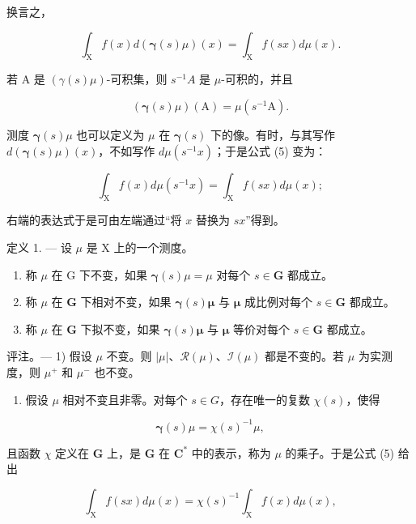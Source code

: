 换言之，

\[
\int_ {\mathrm{X}} f (x) d (\boldsymbol {\gamma} (s) \mu) (x) = \int_ {\mathrm{X}} f (s x) d \mu (x).\tag{5}
\]

若 A 是 \((\gamma(s)\mu)\)-可积集，则 \(s^{-1}A\) 是 \(\mu\)-可积的，并且

\[
\left(\boldsymbol {\gamma} (s) \mu\right) (\mathrm{A}) = \mu \left(s ^ {- 1} \mathrm{A}\right).\tag{6}
\]

测度 \(\boldsymbol{\gamma}(s)\mu\) 也可以定义为 \(\mu\) 在 \(\boldsymbol{\gamma}(s)\) 下的像。有时，与其写作 \(d(\boldsymbol{\gamma}(s)\mu)(x)\)，不如写作 \(d\mu(s^{-1}x)\)；于是公式 (5) 变为：

\[
\int_ {\mathrm{X}} f (x) d \mu (s ^ {- 1} x) = \int_ {\mathrm{X}} f (s x) d \mu (x);
\]

右端的表达式于是可由左端通过“将 \(x\) 替换为 \(sx\)”得到。

定义 1. --- 设 \(\mu\) 是 X 上的一个测度。

\begin{enumerate}
\def\labelenumi{\alph{enumi})}
\item
  称 \(\mu\) 在 G 下不变，如果 \(\pmb{\gamma}(s)\mu = \mu\) 对每个 \(s\in \mathbf{G}\) 都成立。
\item
  称 \(\mu\) 在 \(\mathbf{G}\) 下相对不变，如果 \(\pmb{\gamma}(s)\pmb{\mu}\) 与 \(\pmb{\mu}\) 成比例对每个 \(s\in \mathbf{G}\) 都成立。
\item
  称 \(\mu\) 在 \(\mathbf{G}\) 下拟不变，如果 \(\pmb{\gamma}(s)\pmb{\mu}\) 与 \(\pmb{\mu}\) 等价对每个 \(s\in \mathbf{G}\) 都成立。
\end{enumerate}

评注。--- 1) 假设 \(\mu\) 不变。则 \(|\mu|\)、\(\mathcal{R}(\mu)\)、\(\mathcal{I}(\mu)\) 都是不变的。若 \(\mu\) 为实测度，则 \(\mu^{+}\) 和 \(\mu^{-}\) 也不变。

\begin{enumerate}
\def\labelenumi{\arabic{enumi})}
\setcounter{enumi}{1}
\tightlist
\item
  假设 \(\mu\) 相对不变且非零。对每个 \(s \in G\)，存在唯一的复数 \(\chi(s)\)，使得
\end{enumerate}

\[
\boldsymbol {\gamma} (s) \mu = \chi (s) ^ {- 1} \mu ,\tag{7}
\]

且函数 \(\chi\) 定义在 \(\mathbf{G}\) 上，是 \(\mathbf{G}\) 在 \(\mathbf{C}^*\) 中的表示，称为 \(\mu\) 的乘子。于是公式 (5) 给出

\[
\int_ {\mathrm{X}} f (s x) d \mu (x) = \chi (s) ^ {- 1} \int_ {\mathrm{X}} f (x) d \mu (x),\tag{8}
\]


